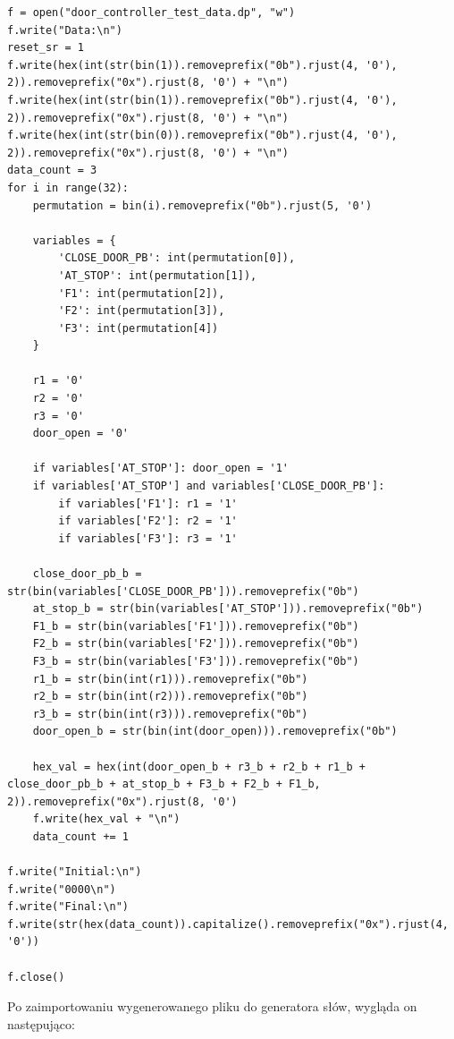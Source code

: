 \documentclass[a4paper]{article}
\begin{document}
\begin{verbatim}
f = open("door_controller_test_data.dp", "w")
f.write("Data:\n")
reset_sr = 1
f.write(hex(int(str(bin(1)).removeprefix("0b").rjust(4, '0'), 2)).removeprefix("0x").rjust(8, '0') + "\n")
f.write(hex(int(str(bin(1)).removeprefix("0b").rjust(4, '0'), 2)).removeprefix("0x").rjust(8, '0') + "\n")
f.write(hex(int(str(bin(0)).removeprefix("0b").rjust(4, '0'), 2)).removeprefix("0x").rjust(8, '0') + "\n")
data_count = 3
for i in range(32):
    permutation = bin(i).removeprefix("0b").rjust(5, '0')
    
    variables = {
        'CLOSE_DOOR_PB': int(permutation[0]),
        'AT_STOP': int(permutation[1]),
        'F1': int(permutation[2]),
        'F2': int(permutation[3]),
        'F3': int(permutation[4])
    }

    r1 = '0'
    r2 = '0'
    r3 = '0'
    door_open = '0'

    if variables['AT_STOP']: door_open = '1'
    if variables['AT_STOP'] and variables['CLOSE_DOOR_PB']:
        if variables['F1']: r1 = '1'
        if variables['F2']: r2 = '1'
        if variables['F3']: r3 = '1'

    close_door_pb_b = str(bin(variables['CLOSE_DOOR_PB'])).removeprefix("0b")
    at_stop_b = str(bin(variables['AT_STOP'])).removeprefix("0b")
    F1_b = str(bin(variables['F1'])).removeprefix("0b")
    F2_b = str(bin(variables['F2'])).removeprefix("0b")
    F3_b = str(bin(variables['F3'])).removeprefix("0b")
    r1_b = str(bin(int(r1))).removeprefix("0b")
    r2_b = str(bin(int(r2))).removeprefix("0b")
    r3_b = str(bin(int(r3))).removeprefix("0b")
    door_open_b = str(bin(int(door_open))).removeprefix("0b")

    hex_val = hex(int(door_open_b + r3_b + r2_b + r1_b + close_door_pb_b + at_stop_b + F3_b + F2_b + F1_b, 2)).removeprefix("0x").rjust(8, '0')
    f.write(hex_val + "\n")
    data_count += 1

f.write("Initial:\n")
f.write("0000\n")
f.write("Final:\n")
f.write(str(hex(data_count)).capitalize().removeprefix("0x").rjust(4, '0'))

f.close()
\end{verbatim}

Po zaimportowaniu wygenerowanego pliku do generatora słów, wygląda on następująco:
\end{document}
